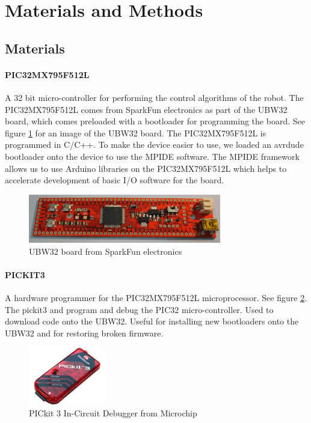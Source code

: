 \documentclass[titlepage,letterpaper,12pt]{article}
\begin{document}
\section{Materials and Methods}
\subsection{Materials}
\paragraph{PIC32MX795F512L}A 32 bit micro-controller for performing the control
algorithms of the robot. The PIC32MX795F512L comes from SparkFun electronics as
part of the UBW32 board, which comes preloaded with a bootloader for programming
the board. See figure \ref{ubw32fig} for an image of the UBW32 board. The
PIC32MX795F512L is programmed in C/C++. To make the device easier to use, we
loaded an avrdude bootloader onto the device to use the MPIDE software. The
MPIDE framework allows us to use Arduino libraries on the PIC32MX795F512L which
helps to accelerate development of basic I/O software for the
board\cite{pic32data}.

\begin{figure}
  \centering
    \includegraphics[width=0.75\textwidth]{figures/UBW32_v24_SparkFun.JPG}
  \caption{UBW32 board from SparkFun electronics\protect\cite{Schmalz2013}}
  \label{ubw32fig}
\end{figure}

\paragraph{PICKIT3}A hardware programmer for the PIC32MX795F512L
microprocessor. See figure \ref{pickit3fig}. The pickit3 and program and debug
the PIC32 micro-controller.  Used to download code onto the UBW32. Useful for
installing new bootloaders onto the UBW32 and for restoring broken
firmware\cite{pickitdata}.

\begin{figure}
  \centering
    \includegraphics[width=0.3\textwidth]{figures/pickit3.jpg}
  \caption{PICkit 3 In-Circuit Debugger from Microchip\protect\cite{pickitfigcite}}
  \label{pickit3fig}
\end{figure}
\end{document}
